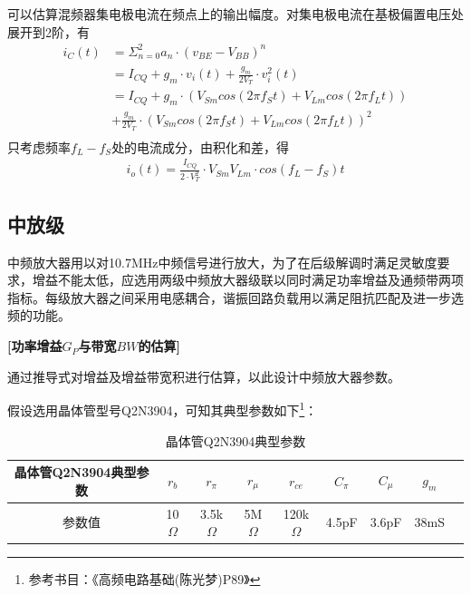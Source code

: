 \documentclass[a4paper,12pt,twoside]{article}
\begin{document}
可以估算混频器集电极电流在频点上的输出幅度。对集电极电流在基极偏置电压处展开到2阶，有
\begin{equation}
\begin{aligned}
      i_{C}(t)&=\Sigma^{2}_{n=0}a_n\cdot (v_{BE}-V_{BB})^{n}\\
      &= I_{CQ}+g_{m}\cdot v_{i}(t)+\frac{g_m}{2V_T}\cdot v_{i}^2(t)\\
      &=I_{CQ}+g_{m}\cdot (V_{Sm}cos(2\pi f_S t)+V_{Lm}cos(2\pi f_L t))
      \\
      &+\frac{g_m}{2V_T}\cdot {(V_{Sm}cos(2\pi f_S t)+V_{Lm}cos(2\pi f_L t))}^2\\
\end{aligned}
\end{equation}
只考虑频率$f_L-f_S$处的电流成分，由积化和差，得
\begin{equation}
    \begin{aligned}
    i_o(t) = \frac{I_{CQ}}{2\cdot V_T^2}\cdot V_{Sm}V_{Lm}\cdot cos(f_L-f_S)t
    \end{aligned}
    \label{混频跨导}
\end{equation}


\subsection{中放级}
中频放大器用以对10.7MHz中频信号进行放大，为了在后级解调时满足灵敏度要求，增益不能太低，应选用两级中频放大器级联以同时满足功率增益及通频带两项指标。每级放大器之间采用电感耦合，谐振回路负载用以满足阻抗匹配及进一步选频的功能。

\textbf{[功率增益$G_P$与带宽$BW$的估算]}

通过推导式对增益及增益带宽积进行估算，以此设计中频放大器参数。

假设选用晶体管型号Q2N3904，可知其典型参数如下\footnote{参考书目：《高频电路基础(陈光梦)P89》}：
\begin{table}[H]
    \centering
    \begin{tabular}{ccccccccc}
    \toprule[1.2pt]
    \midrule
         晶体管Q2N3904典型参数 & $r_b$ &$r_{\pi}$&$r_{\mu}$&$r_{ce}$&$C_{\pi}$&$C_{\mu}$&$g_{m}$\\
         \midrule
         参数值&10$\Omega$ &3.5k$\Omega$&5M$\Omega$&120k$\Omega$&4.5pF&3.6pF&38mS\\
         \bottomrule[1.2pt]
    \end{tabular}
    \caption{晶体管Q2N3904典型参数}
    \label{tab:my_label}
\end{table}
\end{document}
